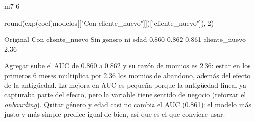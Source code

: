\begin{solucion}{m7-6}
\begin{rcode}
round(exp(coef(modelos[["Con cliente_nuevo"]])["cliente_nuevo"]), 2)
\end{rcode}

\begin{rsalida}
          Original  Con cliente_nuevo Sin genero ni edad 
             0.860              0.862              0.861 
cliente_nuevo 
         2.36 
\end{rsalida}

Agregar  sube el AUC de 0.860 a 0.862 y su razón de
momios es 2.36: estar en los primeros 6 meses multiplica por 2.36 los momios
de abandono, además del efecto de la antigüedad. La mejora en AUC es pequeña
porque la antigüedad lineal ya capturaba parte del efecto, pero la variable
tiene sentido de negocio (reforzar el \emph{onboarding}). Quitar género y edad
casi no cambia el AUC (0.861): el modelo más justo y más simple predice igual
de bien, así que es el que conviene usar.
\end{solucion}

